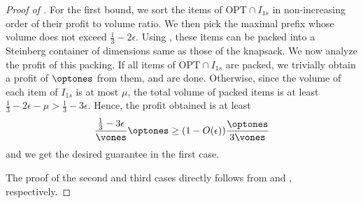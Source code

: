\begin{proof}[Proof of ]
     For the first bound, we sort the items of $\text{OPT}\cap I_{1s}$ in non-increasing order of their profit to volume ratio. We then pick the maximal prefix whose volume does not exceed $\frac{1}{3}-2\epsilon$. Using , these items can be packed into a Steinberg container of dimensions same as those of the knapsack. We now analyze the profit of this packing. If all items of $\text{OPT}\cap I_{1s}$ are packed, we trivially obtain a profit of $\optones$ from them, and are done. Otherwise, since the volume of each item of $I_{1s}$ is at most $\mu$, the total volume of packed items is at least $\frac{1}{3}- 2\epsilon -\mu > \frac{1}{3}-3\epsilon$. Hence, the profit obtained is at least 
    \[ \frac{\frac{1}{3}-3\epsilon}{\vones}\optones \ge (1-O(\epsilon))\frac{\optones}{3\vones}\]
    and we get the desired guarantee in the first case. 

    The proof of the second and third cases directly follows from  and , respectively.
\end{proof}

  
















